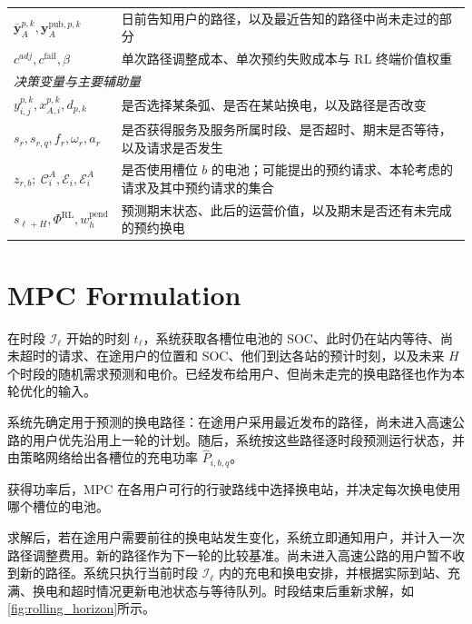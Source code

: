 \documentclass[12pt,a4paper,UTF8]{ctexart}
\begin{document}
\begin{table}[!ht]
\begin{tabular}{@{}lp{11cm}@{}}
    $\bar{\mathbf y}_{A}^{p,k},\mathbf y_{A}^{\mathrm{pub},p,k}$ & 日前告知用户的路径，以及最近告知的路径中尚未走过的部分 \\
    $c^{adj},c^{\mathrm{fail}},\beta$ & 单次路径调整成本、单次预约失败成本与 RL 终端价值权重 \\
    \midrule
    \multicolumn{2}{l}{\textit{决策变量与主要辅助量}} \\
    $y_{i,j}^{p,k},x_{A,i}^{p,k},d_{p,k}$ & 是否选择某条弧、是否在某站换电，以及路径是否改变 \\
    $s_r,s_{r,q},f_r,\omega_r,a_r$ & 是否获得服务及服务所属时段、是否超时、期末是否等待，以及请求是否发生 \\
    $z_{r,b};\ \mathcal C_i^A,\mathcal E_i,\mathcal E_i^A$ & 是否使用槽位 $b$ 的电池；可能提出的预约请求、本轮考虑的请求及其中预约请求的集合 \\
    $s_{\ell+H},\Phi^{\mathrm{RL}},w_h^{\mathrm{pend}}$ & 预测期末状态、此后的运营价值，以及期末是否还有未完成的预约换电 \\
    \bottomrule
  \end{tabular}
\end{table}


\section{MPC Formulation}

在时段 $\mathcal I_\ell$ 开始的时刻 $t_\ell$，系统获取各槽位电池的 SOC、此时仍在站内等待、尚未超时的请求、在途用户的位置和 SOC、他们到达各站的预计时刻，以及未来 $H$ 个时段的随机需求预测和电价。已经发布给用户、但尚未走完的换电路径也作为本轮优化的输入。

系统先确定用于预测的换电路径：在途用户采用最近发布的路径，尚未进入高速公路的用户优先沿用上一轮的计划。随后，系统按这些路径逐时段预测运行状态，并由策略网络给出各槽位的充电功率 $\widehat P_{i,b,q}$。

获得功率后，MPC 在各用户可行的行驶路线中选择换电站，并决定每次换电使用哪个槽位的电池。

求解后，若在途用户需要前往的换电站发生变化，系统立即通知用户，并计入一次路径调整费用。新的路径作为下一轮的比较基准。尚未进入高速公路的用户暂不收到新的路径。系统只执行当前时段 $\mathcal I_\ell$ 内的充电和换电安排，并根据实际到站、充满、换电和超时情况更新电池状态与等待队列。时段结束后重新求解，如\autoref{fig:rolling_horizon}所示。
\end{document}
